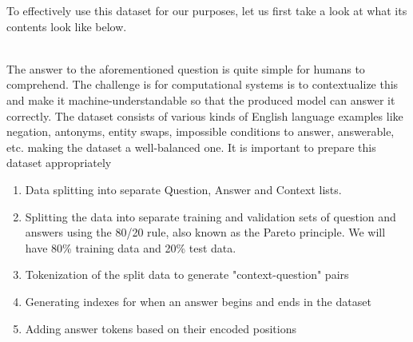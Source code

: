 \documentclass[a4paper,12pt]{report}
\begin{document}
	    To effectively use this dataset for our purposes, let us first take a look at what its contents look like below.\\ \\
	    \noindent{}
	    \newline
	    \newline

	    The answer to the aforementioned question is quite simple for humans to comprehend. The challenge is for computational systems is to contextualize this and make it machine-understandable so that the produced model can answer it correctly.
	    The dataset consists of various kinds of English language examples like negation, antonyms, entity swaps, impossible conditions to answer, answerable, etc. making the dataset a well-balanced one.
	    It is important to prepare this dataset appropriately 

	    \begin{enumerate}
	    	\item Data splitting into separate Question, Answer and Context lists.
	    	\item Splitting the data into separate training and validation sets of  question and answers using the 80/20 rule, also known as the Pareto principle. We will have 80\% training data and 20\% test data.
	    	\item Tokenization of the split data to generate "context-question" pairs
	    	\item Generating indexes for when an answer begins and ends in the dataset
	    	\item Adding answer tokens based on their encoded positions
	    \end{enumerate}
\end{document}
